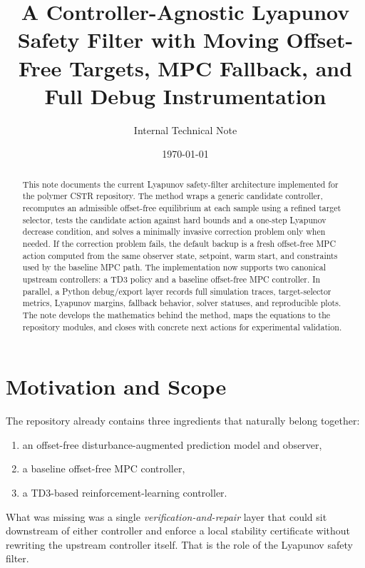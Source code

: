 \documentclass[11pt]{article}
\title{A Controller-Agnostic Lyapunov Safety Filter with Moving Offset-Free Targets, MPC Fallback, and Full Debug Instrumentation}
\author{Internal Technical Note}
\date{\today}
\begin{document}
\maketitle

\begin{abstract}
This note documents the current Lyapunov safety-filter architecture implemented for the polymer CSTR repository. The method wraps a generic candidate controller, recomputes an admissible offset-free equilibrium at each sample using a refined target selector, tests the candidate action against hard bounds and a one-step Lyapunov decrease condition, and solves a minimally invasive correction problem only when needed. If the correction problem fails, the default backup is a fresh offset-free MPC action computed from the same observer state, setpoint, warm start, and constraints used by the baseline MPC path. The implementation now supports two canonical upstream controllers: a TD3 policy and a baseline offset-free MPC controller. In parallel, a Python debug/export layer records full simulation traces, target-selector metrics, Lyapunov margins, fallback behavior, solver statuses, and reproducible plots. The note develops the mathematics behind the method, maps the equations to the repository modules, and closes with concrete next actions for experimental validation.
\end{abstract}

\section{Motivation and Scope}
The repository already contains three ingredients that naturally belong together:
\begin{enumerate}[leftmargin=*]
\item an offset-free disturbance-augmented prediction model and observer,
\item a baseline offset-free MPC controller,
\item a TD3-based reinforcement-learning controller.
\end{enumerate}
What was missing was a single \emph{verification-and-repair} layer that could sit downstream of either controller and enforce a local stability certificate without rewriting the upstream controller itself. That is the role of the Lyapunov safety filter.
\end{document}
